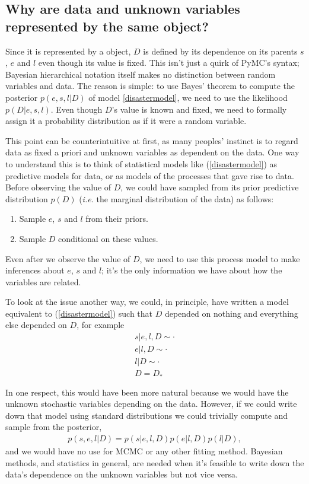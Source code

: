 \subsection*{Why are data and unknown variables represented by the same object?}
Since it is represented by a  object, $D$ is defined by its dependence on its parents $s$, $e$ and $l$ even though its value is fixed. This isn't just a quirk of PyMC's syntax; Bayesian hierarchical notation itself makes no distinction between random variables and data. The reason is simple: to use Bayes' theorem to compute the posterior $p(e,s,l|D)$ of model \ref{disastermodel}, we need to use the likelihood $p(D|e,s,l)$. Even though $D$'s value is known and fixed, we need to formally assign it a probability distribution as if it were a random variable.

This point can be counterintuitive at first, as many peoples' instinct is to regard data as fixed a priori and unknown variables as dependent on the data. One way to understand this is to think of statistical models like (\ref{disastermodel}) as predictive models for data, or as models of the processes that gave rise to data. Before observing the value of $D$, we could have sampled from its prior predictive distribution $p(D)$ (\emph{i.e.} the marginal distribution of the data) as follows:
\begin{enumerate}
    \item Sample $e$, $s$ and $l$ from their priors.
    \item Sample $D$ conditional on these values.
\end{enumerate}
Even after we observe the value of $D$, we need to use this process model to make inferences about $e$, $s$ and $l$; it's the only information we have about how the variables are related.

\medskip
To look at the issue another way, we could, in principle, have written a model equivalent to (\ref{disastermodel}) such that $D$ depended on nothing and everything else depended on $D$, for example
\begin{eqnarray*}
    s|e,l,D\sim\cdot\\
    e|l,D\sim\cdot\\
    l|D\sim\cdot\\
    D=D_*
\end{eqnarray*}

In one respect, this would have been more natural because we would have the unknown stochastic variables depending on the data. However, if we could write down that model using standard distributions we could trivially compute and sample from the posterior,
\begin{eqnarray*}
    p(s,e,l|D) = p(s|e, l, D) p(e|l, D) p(l|D),
\end{eqnarray*}
and we would have no use for MCMC or any other fitting method. Bayesian methods, and statistics in general, are needed when it's feasible to write down the data's dependence on the unknown variables but not vice versa.



